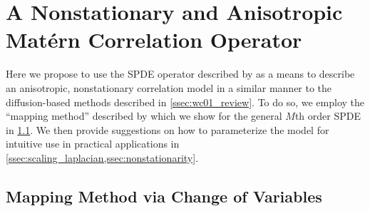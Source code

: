 \section{A Nonstationary and Anisotropic Mat\'ern Correlation Operator}
\label{sec:matern_operator}

Here we propose to use the SPDE operator described by \citet{RSSB:RSSB777}
as a means to describe an anisotropic, nonstationary correlation model in a
similar manner to the diffusion-based methods described in
\cref{ssec:wc01_review}.
To do so, we employ the ``mapping method'' described by \citet{RSSB:RSSB777}
which we show for the general $M$th order SPDE in \cref{ssec:mapping_method}.
We then provide suggestions on how to parameterize the model for intuitive use
in practical applications in \cref{ssec:scaling_laplacian,ssec:nonstationarity}.


\subsection{Mapping Method via Change of Variables}
\label{ssec:mapping_method}

